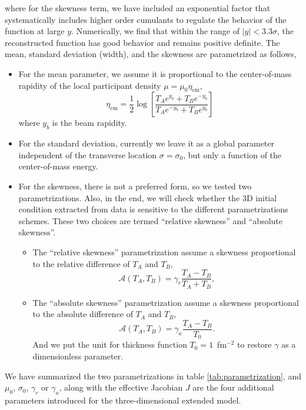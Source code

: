 where for the skewness term, we have included an exponential factor that systematically includes higher order cumulants to regulate the behavior of the function at large $y$.
Numerically, we find that within the range of $|y| < 3.3\sigma$, the reconstructed function has good behavior and remains positive definite.
The mean, standard deviation (width), and the skewness are parametrized as follows,
\begin{itemize}
\item For the mean parameter, we assume it is proportional to the center-of-mass rapidity of the local participant density $\mu = \mu_0\eta_\text{cm}$,
\begin{equation}
  \eta_\text{cm}=\frac{1}{2} \log \left[\frac{T_A e^{y_b}+T_Be^{-y_b}}{T_A e^{-y_b}+T_B e^{y_b}}\right]
\end{equation}
where $y_b$ is the beam rapidity.
\item For the standard deviation, currently we leave it as a global parameter independent of the transverse location $\sigma = \sigma_0$, but only a function of the center-of-mass energy.
\item For the skewness, there is not a preferred form, so we tested two parametrizations. 
Also, in the end, we will check whether the 3D initial condition extracted from data is sensitive to the different parametrizations schemes.
These two choices are termed ``relative skewness'' and ``absolute skewness''.
\begin{itemize}
\item The ``relative skewness'' parametrization assume a skewness proportional to the relative difference of $T_A$ and $T_B$,
\begin{equation}
  \mathcal{A}(T_A, T_B) = \gamma_r\frac{T_A - T_B}{T_A + T_B},
\end{equation}
\item The ``absolute skewness'' parametrization assume a skewness proportional to the absolute difference of $T_A$ and $T_B$,
\begin{equation}
  \mathcal{A}(T_A, T_B) = \gamma_a \frac{T_A - T_B}{T_0}.
\end{equation}
And we put the unit for thickness function $T_0=1$~fm$^{-2}$ to restore $\gamma$ as a dimensionless parameter.
\end{itemize}
\end{itemize}
We have summarized the two parametrizations in table \ref{tab:parametrization}, and $\mu_0$, $\sigma_0$, $\gamma_r$ or $\gamma_a$, along with the effective Jacobian $J$ are the four additional parameters introduced for the three-dimensional extended \trento model.
